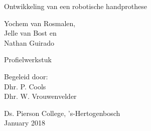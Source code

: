 \begin{titlepage}
    \begin{center}

        \vspace*{1.5cm}

        \huge
        Ontwikkeling van een robotische handprothese

        \vspace{1.5cm}

        \normalsize
        Yochem van Rosmalen, \\
        Jelle van Bost en \\
        Nathan Guirado

        \vspace{1.5cm}

        \normalsize
        Profielwerkstuk

        \vfill

        \normalsize
        Begeleid door:\\
        Dhr. P. Cools\\
        Dhr. W. Vrouwenvelder

        \vspace{1cm}

        \normalsize
        Ds. Pierson College, 's-Hertogenbosch\\
        January 2018

        \vspace{1cm}

    \end{center}
\end{titlepage}
